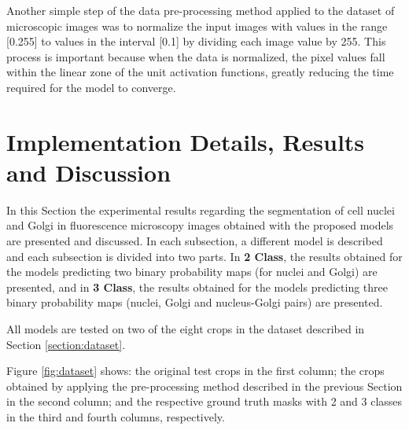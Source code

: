 Another simple step of the data pre-processing method applied to the dataset of microscopic images was to normalize the input images with values in the range [0.255] to values in the interval [0.1] by dividing each image value by 255. This process is important because when the data is normalized, the pixel values fall within the linear zone of the unit activation functions, greatly reducing the time required for the model to converge.

\section{Implementation Details, Results and Discussion}

In this Section the experimental results regarding the segmentation of cell nuclei and Golgi in fluorescence microscopy images obtained with the proposed models are presented and discussed. In each subsection, a different model is described and each subsection is divided into two parts. In \textbf{2 Class}, the results obtained for the models predicting two binary probability maps (for nuclei and Golgi) are presented, and in \textbf{3 Class}, the results obtained for the models predicting three binary probability maps (nuclei, Golgi and nucleus-Golgi pairs) are presented.

All models are tested on two of the eight crops in the dataset described in Section \ref{section:dataset}. 

​Figure \ref{fig:dataset} shows: the original test crops in the first column; the crops obtained by applying the pre-processing method described in the previous Section in the second column; and the respective ground truth masks with 2 and 3 classes in the third and fourth columns, respectively.


